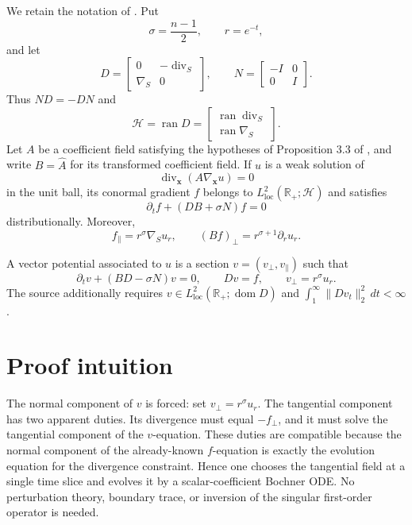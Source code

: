 \documentclass[11pt]{article}
\newcommand{\cH}{\mathcal H}
\newcommand{\Div}{\operatorname{div}_{S}}
\newcommand{\grad}{\nabla_{S}}
\newcommand{\R}{\mathbb R}
\newcommand{\dom}{\operatorname{dom}}
\begin{document}
We retain the notation of \cite[Section 3]{AR}. Put
\[
  \sigma=\frac{n-1}{2},\qquad r=e^{-t},
\]
and let
\[
 D=\begin{bmatrix}0&-\Div\\ \grad&0\end{bmatrix},
 \qquad
 N=\begin{bmatrix}-I&0\\0&I\end{bmatrix}.
\]
Thus $ND=-DN$ and
\[
 \cH=\operatorname{ran}D
 =\begin{bmatrix}\operatorname{ran}\Div\\ \operatorname{ran}\grad\end{bmatrix}.
\]
Let $A$ be a coefficient field satisfying the hypotheses of Proposition 3.3 of \cite{AR}, and write $B=\widehat A$ for its transformed coefficient field. If $u$ is a weak solution of
\[
 \operatorname{div}_{\mathbf x}(A\nabla_{\mathbf x}u)=0
\]
in the unit ball, its conormal gradient $f$ belongs to $L^2_{\mathrm{loc}}(\R_+;\cH)$ and satisfies
\begin{equation}\label{eq:f}
 \partial_t f+(DB+\sigma N)f=0
\end{equation}
distributionally. Moreover,
\begin{equation}\label{eq:components}
 f_\parallel=r^\sigma\grad u_r,
 \qquad
 (Bf)_\perp=r^{\sigma+1}\partial_r u_r.
\end{equation}

A vector potential associated to $u$ is a section $v=(v_\perp,v_\parallel)$ such that
\begin{equation}\label{eq:v}
 \partial_t v+(BD-\sigma N)v=0,
 \qquad Dv=f,
 \qquad v_\perp=r^\sigma u_r.
\end{equation}
The source additionally requires $v\in L^2_{\mathrm{loc}}(\R_+;\dom D)$ and
$\int_1^\infty\|Dv_t\|_2^2\,dt<\infty$.

\section{Proof intuition}

The normal component of $v$ is forced: set $v_\perp=r^\sigma u_r$. The tangential component has two apparent duties. Its divergence must equal $-f_\perp$, and it must solve the tangential component of the $v$-equation. These duties are compatible because the normal component of the already-known $f$-equation is exactly the evolution equation for the divergence constraint. Hence one chooses the tangential field at a single time slice and evolves it by a scalar-coefficient Bochner ODE. No perturbation theory, boundary trace, or inversion of the singular first-order operator is needed.
\end{document}
